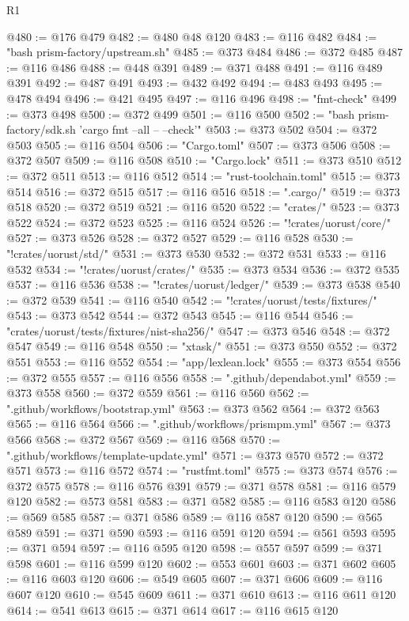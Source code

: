 \begin{lexlean}{R1}
\begin{coremodule}
@480 := @176 @479
@482 := @480 @48 @120
@483 := @116 @482
@484 := "bash prism-factory/upstream.sh"
@485 := @373 @484
@486 := @372 @485
@487 := @116 @486
@488 := @448 @391
@489 := @371 @488
@491 := @116 @489 @391
@492 := @487 @491
@493 := @432 @492
@494 := @483 @493
@495 := @478 @494
@496 := @421 @495
@497 := @116 @496
@498 := "fmt-check"
@499 := @373 @498
@500 := @372 @499
@501 := @116 @500
@502 := "bash prism-factory/sdk.sh 'cargo fmt --all -- --check'"
@503 := @373 @502
@504 := @372 @503
@505 := @116 @504
@506 := "Cargo.toml"
@507 := @373 @506
@508 := @372 @507
@509 := @116 @508
@510 := "Cargo.lock"
@511 := @373 @510
@512 := @372 @511
@513 := @116 @512
@514 := "rust-toolchain.toml"
@515 := @373 @514
@516 := @372 @515
@517 := @116 @516
@518 := ".cargo/"
@519 := @373 @518
@520 := @372 @519
@521 := @116 @520
@522 := "crates/"
@523 := @373 @522
@524 := @372 @523
@525 := @116 @524
@526 := "!crates/uorust/core/"
@527 := @373 @526
@528 := @372 @527
@529 := @116 @528
@530 := "!crates/uorust/std/"
@531 := @373 @530
@532 := @372 @531
@533 := @116 @532
@534 := "!crates/uorust/crates/"
@535 := @373 @534
@536 := @372 @535
@537 := @116 @536
@538 := "!crates/uorust/ledger/"
@539 := @373 @538
@540 := @372 @539
@541 := @116 @540
@542 := "!crates/uorust/tests/fixtures/"
@543 := @373 @542
@544 := @372 @543
@545 := @116 @544
@546 := "crates/uorust/tests/fixtures/nist-sha256/"
@547 := @373 @546
@548 := @372 @547
@549 := @116 @548
@550 := "xtask/"
@551 := @373 @550
@552 := @372 @551
@553 := @116 @552
@554 := "app/lexlean.lock"
@555 := @373 @554
@556 := @372 @555
@557 := @116 @556
@558 := ".github/dependabot.yml"
@559 := @373 @558
@560 := @372 @559
@561 := @116 @560
@562 := ".github/workflows/bootstrap.yml"
@563 := @373 @562
@564 := @372 @563
@565 := @116 @564
@566 := ".github/workflows/prismpm.yml"
@567 := @373 @566
@568 := @372 @567
@569 := @116 @568
@570 := ".github/workflows/template-update.yml"
@571 := @373 @570
@572 := @372 @571
@573 := @116 @572
@574 := "rustfmt.toml"
@575 := @373 @574
@576 := @372 @575
@578 := @116 @576 @391
@579 := @371 @578
@581 := @116 @579 @120
@582 := @573 @581
@583 := @371 @582
@585 := @116 @583 @120
@586 := @569 @585
@587 := @371 @586
@589 := @116 @587 @120
@590 := @565 @589
@591 := @371 @590
@593 := @116 @591 @120
@594 := @561 @593
@595 := @371 @594
@597 := @116 @595 @120
@598 := @557 @597
@599 := @371 @598
@601 := @116 @599 @120
@602 := @553 @601
@603 := @371 @602
@605 := @116 @603 @120
@606 := @549 @605
@607 := @371 @606
@609 := @116 @607 @120
@610 := @545 @609
@611 := @371 @610
@613 := @116 @611 @120
@614 := @541 @613
@615 := @371 @614
@617 := @116 @615 @120

\end{coremodule}
\end{lexlean}
